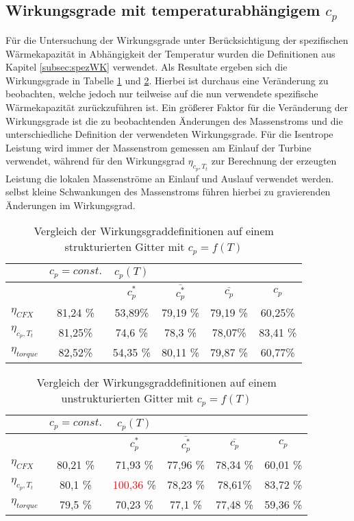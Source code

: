 \subsection{Wirkungsgrade mit temperaturabhängigem $c_p$}
\begin{table}[H]
	Für die Untersuchung der Wirkungsgrade unter Berücksichtigung der spezifischen Wärmekapazität in Abhängigkeit der Temperatur wurden die Definitionen aus Kapitel \ref{subsec:spezWK} verwendet. 
	Als Resultate ergeben sich die Wirkungsgrade in Tabelle \ref{tab:strukturiertmycp} und \ref{tab:unstrukturiertmycp}. Hierbei ist durchaus eine Veränderung zu beobachten, welche jedoch nur teilweise auf die nun verwendete spezifische Wärmekapazität zurückzuführen ist. Ein größerer Faktor für die Veränderung der Wirkungsgrade ist die zu beobachtenden Änderungen des Massenstroms und die unterschiedliche Definition der verwendeten Wirkungsgrade. Für die Isentrope Leistung wird immer der Massenstrom gemessen am Einlauf der Turbine verwendet, während für den Wirkungsgrad $\eta_{c_p, T_t}$ zur Berechnung der erzeugten Leistung die lokalen Massenströme an Einlauf und Auslauf verwendet werden. selbst kleine Schwankungen des Massenstroms führen hierbei zu gravierenden Änderungen im Wirkungsgrad.
	
	\centering
	\caption{Vergleich der Wirkungsgraddefinitionen auf einem strukturierten Gitter mit $c_p = f(T)$}
	\begin{tabular}{ l| c | c c c c}
		&	$c_p = const.$	&	$c_p(T)$	&		&		&		\\
		\hline
		&		&	$c_p^*$	&	$\overline{c_p^*}$	&	$\overline{c_p}$	&	$c_p$	\\
		\hline
		$\eta_{CFX}$	&	81,24 \%	&	53,89\%	&	79,19 \%	&	79,19 \%	&	60,25\%	\\
		$\eta_{c_p, T_t}$	&	81,25\%	&	74,6 \%	&	78,3 \%	&	78,07\%	&	83,41 \%	\\
	$\eta_{torque}$	&	82,52\%	&	54,35 \%	&	80,11 \%	&	79,87 \%	&	60,77\%	\\
		
	\end{tabular}
	\label{tab:strukturiertmycp}
\end{table}

\begin{table}[H]
	\centering
	\caption{Vergleich der Wirkungsgraddefinitionen auf einem unstrukturierten Gitter mit $c_p = f(T)$}
	\begin{tabular}{ l| c | c c c c}
		&	$c_p = const.$	&	$c_p(T)$	&		&		&		\\
		\hline
		&		&$c_p^*$	&	$\overline{c_p^*}$	&	$\overline{c_p}$	&	$c_p$	\\
		\hline
		$\eta_{CFX}$	&	80,21 \%	&	71,93 \%	&	77,96 \%	&	78,34 \%	&	60,01 \%	\\
		$\eta_{c_p, T_t}$	&	80,1 \%	&	\textcolor{red}{100,36} \%	&	78,23 \%	&	78,61\%	&	83,72 \%	\\
		$\eta_{torque}$	&	79,5 \%	&	70,23 \%	&	77,1 \%	&	77,48 \%	&	59,36 \%	\\
		
	\end{tabular}
	\label{tab:unstrukturiertmycp}
\end{table}